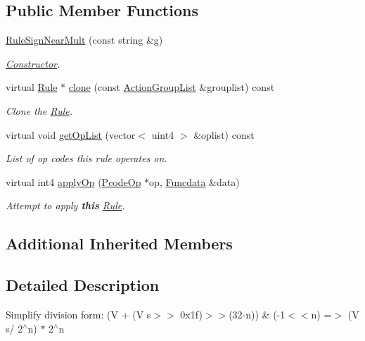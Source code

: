 \subsection*{Public Member Functions}
\begin{DoxyCompactItemize}
\item 
\mbox{\hyperlink{class_rule_sign_near_mult_a30e94a171a736e659b64c7fdb37213aa}{Rule\+Sign\+Near\+Mult}} (const string \&g)
\begin{DoxyCompactList}\small\item\em \mbox{\hyperlink{class_constructor}{Constructor}}. \end{DoxyCompactList}\item 
virtual \mbox{\hyperlink{class_rule}{Rule}} $\ast$ \mbox{\hyperlink{class_rule_sign_near_mult_a53b45d474b33bcf2fd77a382717d0365}{clone}} (const \mbox{\hyperlink{class_action_group_list}{Action\+Group\+List}} \&grouplist) const
\begin{DoxyCompactList}\small\item\em Clone the \mbox{\hyperlink{class_rule}{Rule}}. \end{DoxyCompactList}\item 
virtual void \mbox{\hyperlink{class_rule_sign_near_mult_a4c1e22ea265dc4da51b6a05e1089b3fe}{get\+Op\+List}} (vector$<$ uint4 $>$ \&oplist) const
\begin{DoxyCompactList}\small\item\em List of op codes this rule operates on. \end{DoxyCompactList}\item 
virtual int4 \mbox{\hyperlink{class_rule_sign_near_mult_a37aa70b7da5c91e0d7f8ea81a98869f6}{apply\+Op}} (\mbox{\hyperlink{class_pcode_op}{Pcode\+Op}} $\ast$op, \mbox{\hyperlink{class_funcdata}{Funcdata}} \&data)
\begin{DoxyCompactList}\small\item\em Attempt to apply {\bfseries{this}} \mbox{\hyperlink{class_rule}{Rule}}. \end{DoxyCompactList}\end{DoxyCompactItemize}
\subsection*{Additional Inherited Members}


\subsection{Detailed Description}
Simplify division form\+: {\ttfamily (V + (V s$>$$>$ 0x1f)$>$$>$(32-\/n)) \& (-\/1$<$$<$n) =$>$ (V s/ 2$^\wedge$n) $\ast$ 2$^\wedge$n} 

